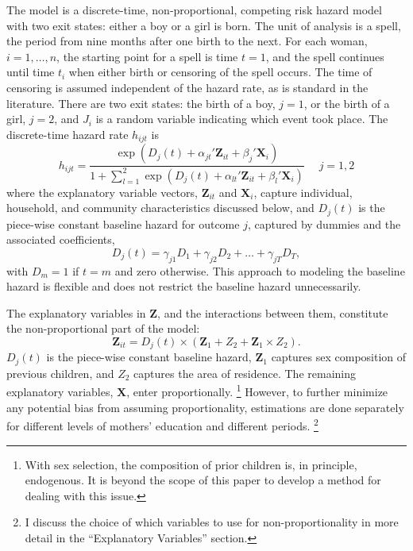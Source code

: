 \documentclass[12pt,letterpaper]{article}
\begin{document}
The model is a discrete-time, non-proportional, competing risk hazard model with two exit 
states: either a boy or a girl is born.
The unit of analysis is a spell, the period from nine months after one birth to the next.
For each woman, $i=1,\ldots,n$, the starting point for a spell is time $t=1$, and 
the spell continues until time $t_i$ when either birth or censoring of the spell 
occurs.
The time of censoring is assumed independent of the hazard rate,
as is standard in the literature.
There are two exit states: the birth of a boy, $j=1$, or the birth of a girl, $j=2$, and 
$J_i$ is a random variable indicating which event took place.
The discrete-time hazard rate $h_{ijt}$ is 
\begin{equation}
 h_{ijt} = \frac{\exp(D_j(t) + \alpha_{jt}'\mathbf{Z}_{it} + \beta_j'\mathbf{X}_{i})} 
 {1 + \sum_{l=1}^2 \exp(D_j(t) + \alpha_{lt}'\mathbf{Z}_{it} + \beta_l'\mathbf{X}_{i})} \: \: \; \; \;  j = 1,2
 \label{eq:hazard}
\end{equation}
where the explanatory variable vectors, $\mathbf{Z}_{it}$ and $\mathbf{X}_{i}$, capture 
individual, household, and community characteristics discussed below,
and $D_{j}(t)$ is the piece-wise constant baseline hazard for outcome $j$, captured
by dummies and the associated coefficients,
\begin{equation}
D_j(t) = \gamma_{j1} D_1 + \gamma_{j2} D_2 + \ldots + \gamma_{jT} D_T,
\end{equation}
with $D_m = 1$ if $t=m$ and zero otherwise.
This approach to modeling the baseline hazard is flexible and does not restrict the 
baseline hazard unnecessarily.

The explanatory variables in $\mathbf{Z}$, and the interactions between them, 
constitute the non-proportional part of the model:
\begin{equation}
 \mathbf{Z}_{it} = D_j(t) \times (\mathbf{Z}_1 + Z_2 + \mathbf{Z}_1 \times Z_2).
\end{equation}
$D_j(t)$ is the piece-wise constant baseline hazard, $\mathbf{Z}_1$ captures sex 
composition of previous children, and $Z_2$ captures the area of residence.
The remaining explanatory variables, $\mathbf{X}$, enter proportionally.%
\footnote{
With sex selection, the composition of prior children is, in principle, endogenous.
It is beyond the scope of this paper to develop a method for dealing with this issue.
}
However, to further minimize any potential bias from assuming proportionality, estimations 
are done separately for different levels of mothers' education and different 
periods.%
\footnote{
I discuss the choice of which variables to use for non-proportionality in more detail
in the ``Explanatory Variables'' section.
}
\end{document}
